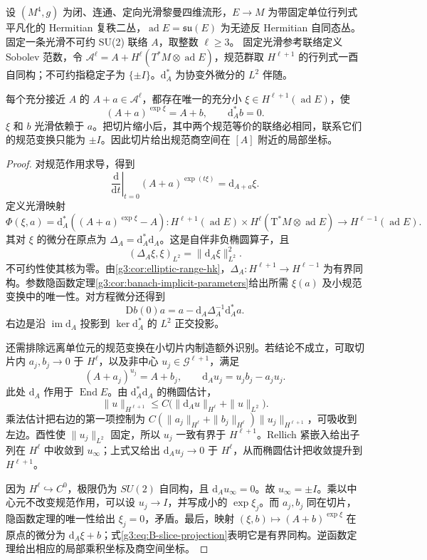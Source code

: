 \begin{theorem}\label{g3:thm:B-local-coulomb-slice}
	设 \((M^4,g)\) 为闭、连通、定向光滑黎曼四维流形，\(E\to M\) 为带固定单位行列式平凡化的 Hermitian 复秩二丛，\(\operatorname{ad}E=\mathfrak{su}(E)\) 为无迹反 Hermitian 自同态丛。固定一条光滑不可约 SU(2) 联络 \(A\)，取整数 \(\ell\ge3\)。
	固定光滑参考联络定义 Sobolev 范数，令 \(\mathcal A^\ell=A+H^\ell(T^*M\otimes\operatorname{ad}E)\)，规范群取 \(H^{\ell+1}\) 的行列式一酉自同构；不可约指稳定子为 \(\{\pm I\}\)。\(\mathrm d_A^*\) 为协变外微分的 \(L^2\) 伴随。

 每个充分接近 \(A\) 的 \(A+a\in\mathcal A^\ell\)，都存在唯一的充分小 \(\xi\in H^{\ell+1}(\operatorname{ad}E)\)，使
 \[
  (A+a)^{\exp\xi}=A+b,\qquad \mathrm d_A^*b=0.
 \]
 \(\xi\) 和 \(b\) 光滑依赖于 \(a\)。把切片缩小后，其中两个规范等价的联络必相同，联系它们的规范变换只能为 \(\pm I\)。因此切片给出规范商空间在 \([A]\) 附近的局部坐标。
\end{theorem}
\begin{proof}
 对规范作用求导，得到
 \[
  \left.\frac{\mathrm d}{\mathrm dt}\right|_{t=0}(A+a)^{\exp(t\xi)}
  =\mathrm d_{A+a}\xi.
 \]
 定义光滑映射
 \[
  \Phi(\xi,a)=\mathrm d_A^*((A+a)^{\exp\xi}-A)
  \colon H^{\ell+1}(\operatorname{ad}E)\times H^\ell(\mathrm T^*M\otimes\operatorname{ad}E)
  \longrightarrow H^{\ell-1}(\operatorname{ad}E).
 \]
 其对 \(\xi\) 的微分在原点为 \(\Delta_A=\mathrm d_A^*\mathrm d_A\)。这是自伴非负椭圆算子，且
 \[
  (\Delta_A\xi,\xi)_{L^2}=\|\mathrm d_A\xi\|_{L^2}^2.
 \]
 不可约性使其核为零。由\cref{g3:cor:elliptic-range-hk}，\(\Delta_A:H^{\ell+1}\to H^{\ell-1}\) 为有界同构。参数隐函数定理\cref{g3:cor:banach-implicit-parameters}给出所需 \(\xi(a)\) 及小规范变换中的唯一性。对方程微分还得到
 \begin{equation}\label{g3:eq:B-slice-projection}
  \mathrm D b(0)a=a-\mathrm d_A\Delta_A^{-1}\mathrm d_A^*a.
 \end{equation}
 右边是沿 \(\operatorname{im}\mathrm d_A\) 投影到 \(\ker \mathrm d_A^*\) 的 \(L^2\) 正交投影。

 还需排除远离单位元的规范变换在小切片内制造额外识别。若结论不成立，可取切片内 \(a_j,b_j\to0\) 于 \(H^\ell\)，以及非中心 \(u_j\in\mathcal G^{\ell+1}\)，满足
 \[
  (A+a_j)^{u_j}=A+b_j,
  \qquad \mathrm d_Au_j=u_jb_j-a_ju_j.
 \]
 此处 \(\mathrm d_A\) 作用于 \(\operatorname{End}E\)。由 \(\mathrm d_A^*\mathrm d_A\) 的椭圆估计，
 \[
  \|u\|_{H^{\ell+1}}
  \le C\bigl(\|\mathrm d_Au\|_{H^\ell}+\|u\|_{L^2}\bigr).
 \]
 乘法估计把右边的第一项控制为
 \(C(\|a_j\|_{H^\ell}+\|b_j\|_{H^\ell})\|u_j\|_{H^{\ell+1}}\)，可吸收到左边。酉性使 \(\|u_j\|_{L^2}\) 固定，所以 \(u_j\) 一致有界于 \(H^{\ell+1}\)。Rellich 紧嵌入给出子列在 \(H^\ell\) 中收敛到 \(u_\infty\)；上式又给出 \(\mathrm d_Au_j\to0\) 于 \(H^\ell\)，从而椭圆估计把收敛提升到 \(H^{\ell+1}\)。

 因为 \(H^\ell\hookrightarrow C^0\)，极限仍为 \(SU(2)\) 自同构，且 \(\mathrm d_Au_\infty=0\)。故 \(u_\infty=\pm I\)。乘以中心元不改变规范作用，可以设 \(u_j\to I\)，并写成小的 \(\exp\xi_j\)。而 \(a_j,b_j\) 同在切片，隐函数定理的唯一性给出 \(\xi_j=0\)，矛盾。最后，映射
 \((\xi,b)\mapsto(A+b)^{\exp\xi}\) 在原点的微分为 \(\mathrm d_A\xi+b\)；式\eqref{g3:eq:B-slice-projection}表明它是有界同构。逆函数定理给出相应的局部乘积坐标及商空间坐标。
\end{proof}

